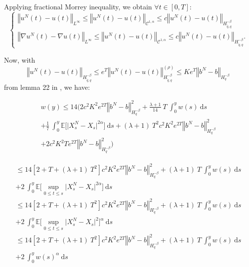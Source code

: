 \documentclass{article}[12pt]
\newcommand{\norme}[1]{\left\Vert #1\right\Vert}
\newcommand{\E}{\mathbb{E}}
\newcommand{\di}{\mathrm{d}}
\begin{document}
        Applying fractional Morrey inequality, we obtain $\forall t\in[0,T]$:
        \begin{equation*}
        \begin{cases}
        \norme{u^N(t) - u(t)}_{L^\infty}\leq\norme{u^N(t) - u(t)}_{\mathcal{C}^{1,\alpha}}\leq c\norme{u^N(t)-u(t)}_{H^{-\beta}_{\tilde{q},q}}\\        
        \norme{\nabla u^N(t) - \nabla u(t)}_{L^\infty}\leq\norme{u^N(t) - u(t)}_{\mathcal{C}^{1,\alpha}}\leq c\norme{u^N(t)-u(t)}_{H^{-\beta}_{\tilde{q},q}}.
        \end{cases}        
        \end{equation*}
        
        Now, with
        \begin{equation*}
        \norme{u^N(t)-u(t)}_{H^{-\beta}_{\tilde{q},q}}\leq e^T \norme{u^N(t)-u(t)}_{H^{-\beta}_{\tilde{q},q}}^{(\rho)}\leq Ke^T\norme{b^N-b}_{H^{-\beta}_{q}}
        \end{equation*} from lemma 22 in \cite{Fla-Iss-Rus-2017}, we have:
        
        \begin{multline*}
        w(y)
        \leq 14\Bigg(2c^2K^2e^{2T}\norme{b^N-b}_{H^{-\beta}_{q}}^2 + \frac{\lambda+1}{14}\ T\ \int_0^y w(s)\ \di s\\+\frac{1}{7}\ \int_0^y\E\bigg[ \Big|X_s^N - X_s\Big|^{2\alpha}\bigg]\ \di s + (\lambda+1)\ T^2 c^2K^2e^{2T}\norme{b^N-b}_{H^{-\beta}_{q}}^2\\ +2c^2K^2Te^{2T}\norme{b^N-b}_{H^{-\beta}_{q}}^2 \Bigg)
        \end{multline*}
        
        \begin{multline*}
        \leq 14\left[2 + T + (\lambda+1)\ T^2\right] c^2K^2e^{2T}\norme{b^N-b}_{H^{-\beta}_{q}}^2  +
        (\lambda+1)\ T\ \int_0^y w(s)\ \di s\\+2\ \int_0^y\E\bigg[ \underset{0\leq t\leq s}{\sup}\big|X_s^N - X_s\big|^{2\alpha}\bigg]\ \di s
        \end{multline*}        
        \begin{multline*}
        \leq 14\left[2 + T + (\lambda+1)\ T^2\right] c^2K^2e^{2T}\norme{b^N-b}_{H^{-\beta}_{q}}^2  +
        (\lambda+1)\ T\ \int_0^y w(s)\ \di s\\+2\ \int_0^y\E\bigg[ \underset{0\leq t\leq s}{\sup}\big|X_s^N - X_s\big|^{2}\bigg]^\alpha\ \di s
        \end{multline*}
        \begin{multline*}
        \leq 14\left[2 + T + (\lambda+1)\ T^2\right] c^2K^2e^{2T}\norme{b^N-b}_{H^{-\beta}_{q}}^2  +
        (\lambda+1)\ T\ \int_0^y w(s)\ \di s\\+2\ \int_0^y w(s)^\alpha\ \di s
        \end{multline*}
        
\end{document}
